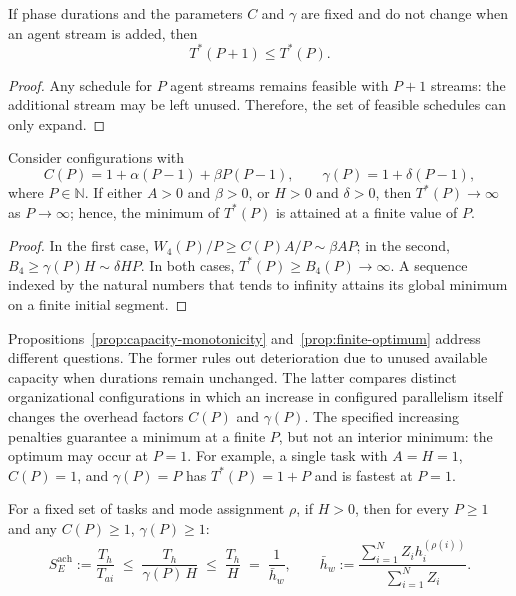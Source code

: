 \begin{proposition}\label{prop:capacity-monotonicity}
If phase durations and the parameters $C$ and $\gamma$ are fixed and do not change when an agent stream is added, then
\[
  T^{*}(P+1)\le T^{*}(P).
\]
\end{proposition}

\begin{proof}
Any schedule for $P$ agent streams remains feasible with $P+1$ streams: the additional stream may be left unused. Therefore, the set of feasible schedules can only expand.
\end{proof}

\begin{proposition}\label{prop:finite-optimum}
Consider configurations with
\[
 C(P)=1+\alpha(P-1)+\beta P(P-1),\qquad
 \gamma(P)=1+\delta(P-1),
\]
where $P\in\mathbb N$. If either $A>0$ and $\beta>0$, or $H>0$ and $\delta>0$, then $T^{*}(P)\to\infty$ as $P\to\infty$; hence, the minimum of $T^{*}(P)$ is attained at a finite value of $P$.
\end{proposition}

\begin{proof}
In the first case, $W_4(P)/P\ge C(P)A/P\sim\beta AP$; in the second, $B_4\ge\gamma(P)H\sim\delta HP$. In both cases, $T^{*}(P)\ge B_4(P)\to\infty$. A sequence indexed by the natural numbers that tends to infinity attains its global minimum on a finite initial segment.
\end{proof}

Propositions~\ref{prop:capacity-monotonicity} and~\ref{prop:finite-optimum} address different questions. The former rules out deterioration due to unused available capacity when durations remain unchanged. The latter compares distinct organizational configurations in which an increase in configured parallelism itself changes the overhead factors $C(P)$ and $\gamma(P)$. The specified increasing penalties guarantee a minimum at a finite $P$, but not an interior minimum: the optimum may occur at $P=1$. For example, a single task with $A=H=1$, $C(P)=1$, and $\gamma(P)=P$ has $T^*(P)=1+P$ and is fastest at $P=1$.

\begin{proposition}\label{prop:amdahl}
For a fixed set of tasks and mode assignment $\rho$, if $H>0$, then for every $P \ge 1$ and any $C(P) \ge 1$, $\gamma(P) \ge 1$:
\[
  S_E^{\mathrm{ach}}:=\frac{T_h}{T_{ai}}
  \;\le\; \frac{T_h}{\gamma(P)\,H} \;\le\; \frac{T_h}{H} \;=\; \frac{1}{\bar{h}_w},
  \qquad
  \bar{h}_w := \frac{\sum_{i=1}^{N} Z_i h_i^{(\rho(i))}}{\sum_{i=1}^{N} Z_i}.
\]
\end{proposition}

